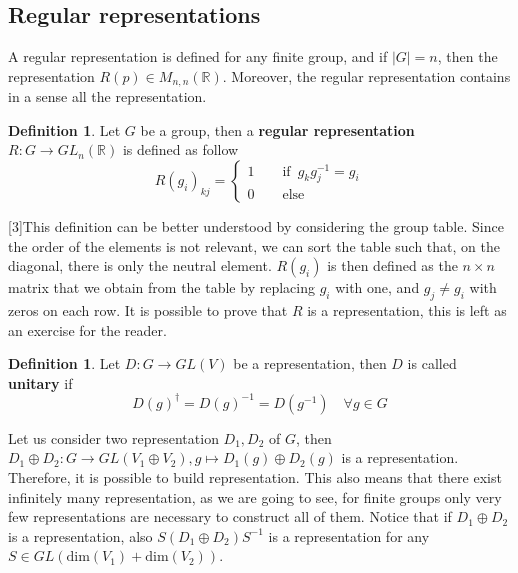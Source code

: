 \documentclass[12pt]{book}
\theoremstyle{plain}
\newcommand{\R}{\mathbb{R}}
\theoremstyle{definition}
\newtheorem{dfn}[thm]{Definition}
\theoremstyle{remark}
\begin{document}
\subsection{Regular representations}\label{section:regularrepresentation}
A regular representation is defined for any finite group, and if $|G|=n$, then the representation $R(p)\in M_{n,n}(\R)$. Moreover, the regular representation contains in a sense all the representation.
\begin{dfn}
Let $G$ be a group, then a \textbf{regular representation} $R:G\to GL_n(\R)$ is defined as follow
\[R(g_i)_{kj} = \begin{cases}
1\qquad \text{if}\,\,\, g_kg_j^{-1} = g_i\\
0 \qquad \text{else}
\end{cases}\]
\end{dfn}
[3]This definition can be better understood by considering the group table. Since the order of the elements is not relevant, we can sort the table such that, on the diagonal, there is only the neutral element. $R(g_i)$ is then defined as the $n\times n$ matrix that we obtain from the table by replacing $g_i$ with one, and $g_j\neq g_i$ with zeros on each row.
It is possible to prove that $R$ is a representation, this is left as an exercise for the reader.
\begin{dfn}
Let $D:G\to GL(V)$ be a representation, then $D$ is called \textbf{unitary} if
\[D(g)^\dagger = D(g)^{-1} = D(g^{-1})\quad \forall g \in G\]
\end{dfn}
Let us consider two representation $D_1,D_2$ of $G$, then $D_1\oplus D_2:G \to GL(V_1\oplus V_2),g\mapsto D_1(g)\oplus D_2(g)$ is a representation. Therefore, it is possible to build representation. This also means that there exist infinitely many representation, as we are going to see, for finite groups only very few representations are necessary to construct all of them. Notice that if $D_1\oplus D_2$ is a representation, also $S(D_1\oplus D_2)S^{-1}$ is a representation for any $S\in GL(\text{dim}(V_1)+\text{dim}(V_2))$. 
\end{document}

